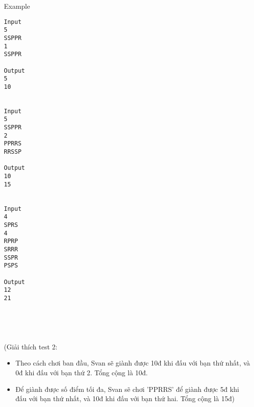 Example
\begin{verbatim}
Input
5
SSPPR
1
SSPPR

Output
5
10


Input
5
SSPPR
2
PPRRS
RRSSP

Output
10
15


Input
4
SPRS
4
RPRP
SRRR
SSPR
PSPS

Output
12
21
\end{verbatim}

 

 

(Giải thích test 2:
\begin{itemize}
	\item Theo cách chơi ban đầu, Svan sẽ giành được 10đ khi đấu với bạn thứ nhất, và 0đ khi đấu với bạn thứ 2. Tổng cộng là 10đ.
	\item Để giành được số điểm tối đa, Svan sẽ chơi 'PPRRS' để giành được 5đ khi đấu với bạn thứ nhất, và 10đ khi đấu với bạn thứ hai. Tổng cộng là 15đ)
\end{itemize}